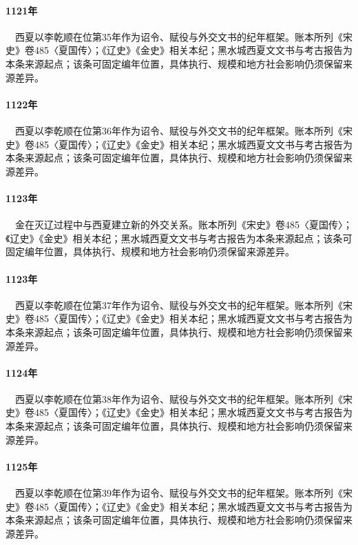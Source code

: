 \paragraph{1121年}　西夏以李乾顺在位第35年作为诏令、赋役与外交文书的纪年框架。账本所列《宋史》卷485〈夏国传〉；《辽史》《金史》相关本纪；黑水城西夏文文书与考古报告为本条来源起点；该条可固定编年位置，具体执行、规模和地方社会影响仍须保留来源差异。

\paragraph{1122年}　西夏以李乾顺在位第36年作为诏令、赋役与外交文书的纪年框架。账本所列《宋史》卷485〈夏国传〉；《辽史》《金史》相关本纪；黑水城西夏文文书与考古报告为本条来源起点；该条可固定编年位置，具体执行、规模和地方社会影响仍须保留来源差异。

\paragraph{1123年}　金在灭辽过程中与西夏建立新的外交关系。账本所列《宋史》卷485〈夏国传〉；《辽史》《金史》相关本纪；黑水城西夏文文书与考古报告为本条来源起点；该条可固定编年位置，具体执行、规模和地方社会影响仍须保留来源差异。

\paragraph{1123年}　西夏以李乾顺在位第37年作为诏令、赋役与外交文书的纪年框架。账本所列《宋史》卷485〈夏国传〉；《辽史》《金史》相关本纪；黑水城西夏文文书与考古报告为本条来源起点；该条可固定编年位置，具体执行、规模和地方社会影响仍须保留来源差异。

\paragraph{1124年}　西夏以李乾顺在位第38年作为诏令、赋役与外交文书的纪年框架。账本所列《宋史》卷485〈夏国传〉；《辽史》《金史》相关本纪；黑水城西夏文文书与考古报告为本条来源起点；该条可固定编年位置，具体执行、规模和地方社会影响仍须保留来源差异。

\paragraph{1125年}　西夏以李乾顺在位第39年作为诏令、赋役与外交文书的纪年框架。账本所列《宋史》卷485〈夏国传〉；《辽史》《金史》相关本纪；黑水城西夏文文书与考古报告为本条来源起点；该条可固定编年位置，具体执行、规模和地方社会影响仍须保留来源差异。

